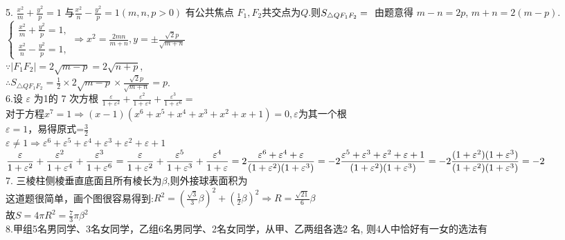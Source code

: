 \documentclass[a4paper,11pt,UTF8]{article}
\begin{document}
5. $\displaystyle\frac{x^2}{m}+\frac{y^2}{p}=1$ 与$ \displaystyle\frac{x^2}{n}-\frac{y^2}{p}=1(m, n, p>0)$ 有公共焦点 $F_1, F_2$共交点为$Q$.则$S_{\triangle Q F_1 F_2}=\\$
由题意得 $m-n=2 p$,  $m+n=2(m-p)$.\\
$\displaystyle\left\{\begin{array}{l}\displaystyle\frac{x^2}{m}+\frac{y^2}{p}=1, \\ \displaystyle\frac{x^2}{n}-\frac{y^2}{p}=1,\end{array}\right.\Rightarrow x^2=\frac{2 m n}{m+n}, y= \pm \frac{\sqrt{2} p}{\sqrt{m+n}}$\\
$\because\displaystyle\left|F_1 F_2\right|=2 \sqrt{m-p}=2 \sqrt{n+p}$,\\
$\therefore\displaystyle S_{\triangle Q F_1 F_2}=\frac{1}{2} \times 2 \sqrt{m-p} \times \frac{\sqrt{2} p}{\sqrt{m+n}}=p$.\\
6.设 $\varepsilon$ 为1的 7 次方根 $\displaystyle\frac{\varepsilon}{1+\varepsilon^2}+\frac{\varepsilon^2}{1+\varepsilon^4}+\frac{\varepsilon^3}{1+\varepsilon^6}=$\\
对于方程$x^7=1\Rightarrow (x-1)(x^6+x^5+x^4+x^3+x^2+x+1)=0,\varepsilon$为其一个根\\
$\varepsilon=1$，易得原式=$\frac{3}{2}$\\
$\varepsilon\neq1\Rightarrow \varepsilon^6+\varepsilon^5+\varepsilon^4+\varepsilon^3+\varepsilon^2+\varepsilon+1$\\
$\displaystyle\frac{\varepsilon}{1+\varepsilon^2}+\frac{\varepsilon^2}{1+\varepsilon^4}+\frac{\varepsilon^3}{1+\varepsilon^6}=\displaystyle\frac{\varepsilon}{1+\varepsilon^2}+\frac{\varepsilon^5}{1+\varepsilon^3}+\frac{\varepsilon^4}{1+\varepsilon}=2\frac{\varepsilon^6+\varepsilon^4+\varepsilon}{(1+\varepsilon^2)(1+\varepsilon^3)}\\
=-2\frac{\varepsilon^5+\varepsilon^3+\varepsilon^2+\varepsilon+1}{(1+\varepsilon^2)(1+\varepsilon^3)}=-2\frac{(1+\varepsilon^2)(1+\varepsilon^3)}{(1+\varepsilon^2)(1+\varepsilon^3)}=-2$\\
7. 三棱柱侧棱垂直底面且所有棱长为$\beta$,则外接球表面积为\\
这道题很简单，画个图很容易得到:$\displaystyle R^2=(\frac{\sqrt{3}}{3}\beta)^2+(\frac{1}{2}\beta)^2\Rightarrow R=\frac{\sqrt{21}}{6}\beta$\\
故$\displaystyle S=4\pi R^2=\frac{7}{3}\pi\beta^2$\\
8.甲组5名男同学、3名女同学，乙组6名男同学、2名女同学，从甲、乙两组各选2
名, 则4人中恰好有一女的选法有\\
\end{document}
